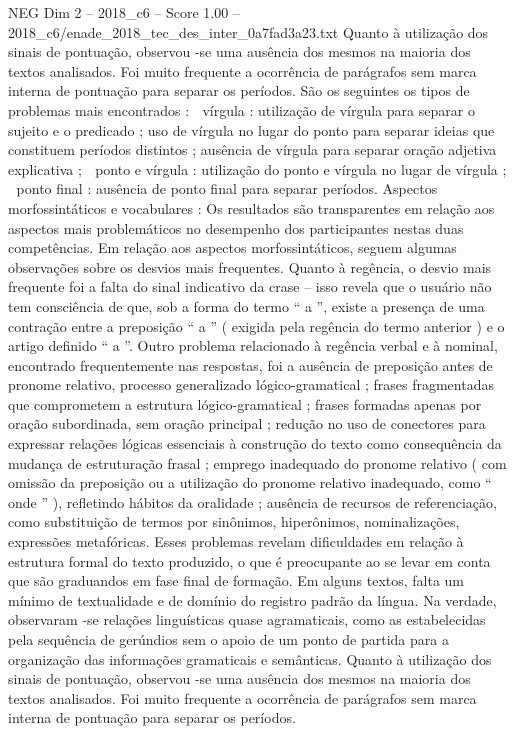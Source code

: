 \begin{textsample}{NEG Dim 2 – 2018\_c6 – Score 1.00 – 2018\_c6/enade\_2018\_tec\_des\_inter\_0a7fad3a23.txt}
Quanto à utilização dos sinais de pontuação, observou -se uma ausência dos mesmos na maioria dos textos analisados.
Foi muito frequente a ocorrência de parágrafos sem marca interna de pontuação para separar os períodos.
São os seguintes os tipos de problemas mais encontrados :  vírgula : utilização de vírgula para separar o sujeito e o predicado ; uso de vírgula no lugar do ponto para separar ideias que constituem períodos distintos ; ausência de vírgula para separar oração adjetiva explicativa ;  ponto e vírgula : utilização do ponto e vírgula no lugar de vírgula ;  ponto final : ausência de ponto final para separar períodos.
Aspectos morfossintáticos e vocabulares : Os resultados são transparentes em relação aos aspectos mais problemáticos no desempenho dos participantes nestas duas competências.
Em relação aos aspectos morfossintáticos, seguem algumas observações sobre os desvios mais frequentes.
Quanto à regência, o desvio mais frequente foi a falta do sinal indicativo da crase – isso revela que o usuário não tem consciência de que, sob a forma do termo “ a ”, existe a presença de uma contração entre a preposição “ a ” ( exigida pela regência do termo anterior ) e o artigo definido “ a ”.
Outro problema relacionado à regência verbal e à nominal, encontrado frequentemente nas respostas, foi a ausência de preposição antes de pronome relativo, processo generalizado lógico-gramatical ; frases fragmentadas que comprometem a estrutura lógico-gramatical ; frases formadas apenas por oração subordinada, sem oração principal ; redução no uso de conectores para expressar relações lógicas essenciais à construção do texto como consequência da mudança de estruturação frasal ; emprego inadequado do pronome relativo ( com omissão da preposição ou a utilização do pronome relativo inadequado, como “ onde ” ), refletindo hábitos da oralidade ; ausência de recursos de referenciação, como substituição de termos por sinônimos, hiperônimos, nominalizações, expressões metafóricas.
Esses problemas revelam dificuldades em relação à estrutura formal do texto produzido, o que é preocupante ao se levar em conta que são graduandos em fase final de formação.
Em alguns textos, falta um mínimo de textualidade e de domínio do registro padrão da língua.
Na verdade, observaram -se relações linguísticas quase agramaticais, como as estabelecidas pela sequência de gerúndios sem o apoio de um ponto de partida para a organização das informações gramaticais e semânticas.
Quanto à utilização dos sinais de pontuação, observou -se uma ausência dos mesmos na maioria dos textos analisados.
Foi muito frequente a ocorrência de parágrafos sem marca interna de pontuação para separar os períodos.

\end{textsample}

